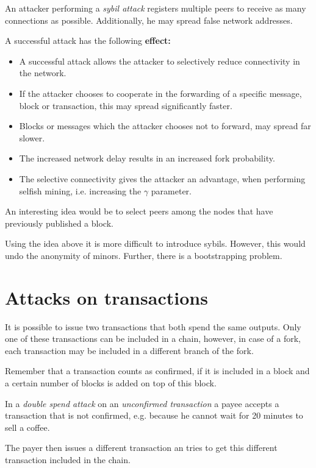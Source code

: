 \begin{definition}
	An attacker performing a \emph{sybil attack} registers multiple peers to receive as many connections as possible. Additionally, he may spread false network addresses. 
\end{definition}

\begin{note}
A successful attack has the following \textbf{effect:}
\begin{itemize}
	\item A successful attack allows the attacker to selectively reduce connectivity in the network. 
	\item If the attacker chooses to cooperate in the forwarding of a specific message, block or transaction, this may spread significantly faster. 
	\item Blocks or messages which the attacker chooses not to forward, may spread far slower.
	\item The increased network delay results in an increased fork probability.
	\item The selective connectivity gives the attacker an advantage, when performing selfish mining, i.e. increasing the $\gamma$ parameter.
\end{itemize}
\end{note}

\begin{idea} An interesting idea would be to select peers among the nodes that have previously published a block.
\end{idea}
\begin{note}
Using the idea above it is more difficult to introduce sybils. However, this would undo the anonymity of minors. Further, there is a bootstrapping problem.
\end{note}

\section{Attacks on transactions}
It is possible to issue two transactions that both spend the same outputs.
Only one of these transactions can be included in a chain, however, in case of a fork, each transaction may be included in a different branch of the fork.

Remember that a transaction counts as confirmed, if it is included in a block and a certain number of blocks is added on top of this block.

\begin{definition}
In a \emph{double spend attack} on an \emph{unconfirmed transaction} a payee accepts a transaction that is not confirmed, e.g. because he cannot wait for 20 minutes to sell a coffee. 

The payer then issues a different transaction an tries to get this different transaction included in the chain.
\end{definition}

